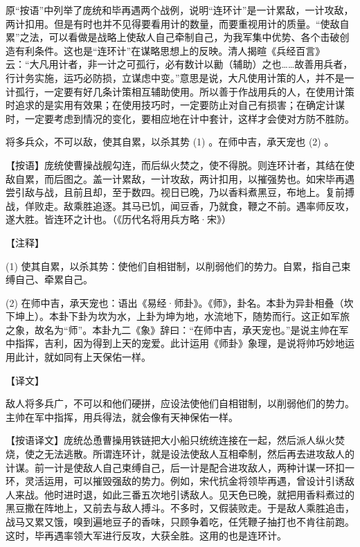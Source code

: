 \documentclass[12pt,UTF8]{ctexbook}
\begin{document}
原“按语”中列举了庞统和毕再遇两个战例，说明“连环计”是一计累敌，一计攻敌，两计扣用。但是有时也并不见得要看用计的数量，而要重视用计的质量。“使敌自累”之法，可以看做是战略上使敌人自己牵制自己，为我军集中优势、各个击破创造有利条件。这也是“连环计”在谋略思想上的反映。清人揭暄《兵经百言》云：“大凡用计者，非一计之可孤行，必有数计以勷（辅助）之也……故善用兵者，行计务实施，运巧必防损，立谋虑中变。”意思是说，大凡使用计策的人，并不是一计孤行，一定要有好几条计策相互辅助使用。所以善于作战用兵的人，在使用计策时追求的是实用有效果；在使用技巧时，一定要防止对自己有损害；在确定计谋时，一定要考虑到情况的变化，要相应地在计中套计，这样才会使对方防不胜防。





将多兵众，不可以敌，使其自累，以杀其势 (1) 。在师中吉，承天宠也 (2) 。

【按语】庞统使曹操战舰勾连，而后纵火焚之，使不得脱。则连环计者，其结在使敌自累，而后图之。盖一计累敌，一计攻敌，两计扣用，以摧强势也。如宋毕再遇尝引敌与战，且前且却，至于数四。视日已晚，乃以香料煮黑豆，布地上。复前搏战，佯败走。敌乘胜追逐。其马已饥，闻豆香，乃就食，鞭之不前。遇率师反攻，遂大胜。皆连环之计也。（《历代名将用兵方略·宋》）





【注释】


(1) 使其自累，以杀其势：使他们自相钳制，以削弱他们的势力。自累，指自己束缚自己、牵累自己。

(2) 在师中吉，承天宠也：语出《易经·师卦》。《师》，卦名。本卦为异卦相叠（坎下坤上）。本卦下卦为坎为水，上卦为坤为地，水流地下，随势而行。这正如军旅之象，故名为“师”。本卦九二《象》辞曰：“在师中吉，承天宠也。”是说主帅在军中指挥，吉利，因为得到上天的宠爱。此计运用《师卦》象理，是说将帅巧妙地运用此计，就如同有上天保佑一样。





【译文】


敌人将多兵广，不可以和他们硬拼，应设法使他们自相钳制，以削弱他们的势力。主帅在军中指挥，用兵得法，就会像有天神保佑一样。

【按语译文】庞统怂恿曹操用铁链把大小船只统统连接在一起，然后派人纵火焚烧，使之无法逃散。所谓连环计，就是设法使敌人互相牵制，然后再去进攻敌人的计谋。前一计是使敌人自己束缚自己，后一计是配合进攻敌人，两种计谋一环扣一环，灵活运用，可以摧毁强敌的势力。例如，宋代抗金将领毕再遇，曾设计引诱敌人来战。他时进时退，如此三番五次地引诱敌人。见天色已晚，就把用香料煮过的黑豆撒在阵地上，又前去与敌人搏斗。不多时，又假装败走。于是敌人乘胜追击，战马又累又饿，嗅到遍地豆子的香味，只顾争着吃，任凭鞭子抽打也不肯往前跑。这时，毕再遇率领大军进行反攻，大获全胜。这用的也是连环计。
\end{document}
